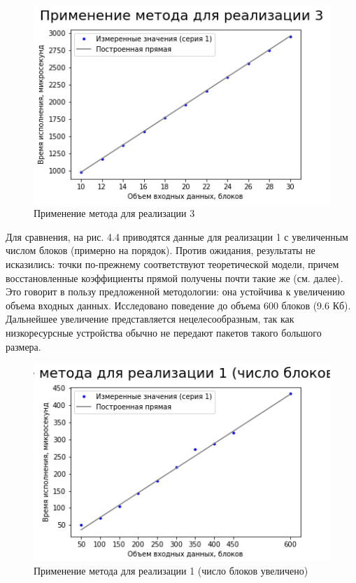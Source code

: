 \begin{figure}[ht!] 
	\includegraphics [scale=0.7] {my_folder/plots//plot3}
	\centering
	\caption{Применение метода для реализации 3} 
\end{figure}

Для сравнения, на рис. 4.4 приводятся данные для реализации 1 с увеличенным числом блоков (примерно на порядок). Против ожидания, результаты не исказились: точки по-прежнему соответствуют теоретической модели, причем восстановленные коэффициенты прямой получены почти такие же (см. далее). Это говорит в пользу предложенной методологии: она устойчива к увеличению объема входных данных. Исследовано поведение до объема 600 блоков (9.6 Кб). Дальнейшее увеличение представляется нецелесообразным, так как низкоресурсные устройства обычно не передают пакетов такого большого размера.

\begin{figure}[ht!] 
	\includegraphics [scale=0.7] {my_folder/plots//plot4}
	\centering
	\caption{Применение метода для реализации 1 (число блоков увеличено)} 
\end{figure}

